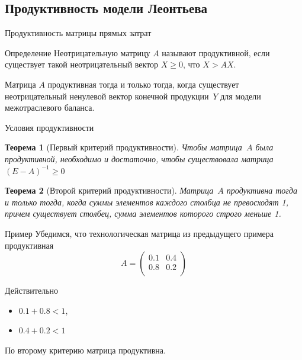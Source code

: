 \documentclass[unicode,11pt,notheorems,xcolor=table]{beamer}
\newtheorem{theorem}{Теорема}
\begin{document}
\subsection{Продуктивность  модели Леонтьева }
\begin{frame}{Продуктивность матрицы прямых затрат}
	\begin{block}{Определение}
		Неотрицательную матрицу $A$ называют \alert{продуктивной}, если существует такой неотрицательный вектор
		$X \geqslant 0$, что $X > AX$.		
	\end{block}
	
	\bigskip

	Матрица $A$ продуктивная тогда и только тогда, когда существует неотрицательный ненулевой вектор конечной продукции~$Y$ для модели межотраслевого баланса. 
	
\end{frame}

\begin{frame}{Условия продуктивности}
	\begin{theorem}[Первый критерий продуктивности]
		Чтобы матрица~$A$ была продуктивной, необходимо и достаточно, 		чтобы  существовала матрица $(E - A)^{-1} \geqslant 0$
	\end{theorem}

	\vspace{1cm}
	\begin{theorem}[Второй критерий продуктивности]
		Матрица~$A$ продуктивна тогда и только тогда, когда суммы элементов каждого столбца не превосходят 1, причем существует столбец, сумма элементов которого строго меньше 1.
	\end{theorem}
\end{frame}
\begin{frame}{Пример}
	Убедимся, что технологическая матрица из предыдущего примера продуктивная
	$$
	A=\begin{pmatrix}
		0.1 & 0.4\\ 
		0.8 & 0.2\\ 
	\end{pmatrix} 
	$$
	
	Действительно 
	\begin{itemize}
		\item $0.1+0.8 < 1$, 
		\item $0.4+0.2 < 1$
	\end{itemize}
	

	По второму критерию матрица продуктивна.

\end{frame}
\end{document}
